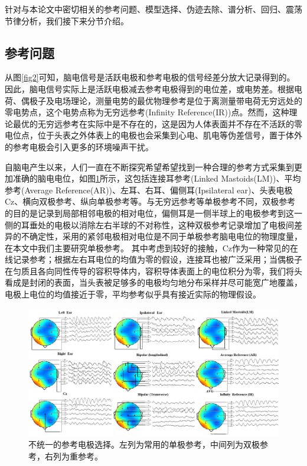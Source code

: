 针对与本论文中密切相关的参考问题、模型选择、伪迹去除、谱分析、回归、震荡节律分析，我们接下来分节介绍。
\subsection{参考问题}
从图\ref{fig2}可知，脑电信号是活跃电极和参考电极的信号经差分放大记录得到的。 因此，脑电信号实际上是活跃电极减去参考电极得到的电位差，或电势差。根据电荷、偶极子及电场理论，测量电势的最优物理参考是位于离测量带电荷无穷远处的零电势点，这个电势点称为无穷远参考(Infinity Reference(IR))点。然而，这种理论最优的无穷远参考在实际中是不存在的，这是因为人体表面并不存在不活跃的零电位点，位于头表之外体表上的电极也会采集到心电、肌电等伪差信号，置于体外的参考电极会引入更多的环境噪声干扰。 

自脑电产生以来，人们一直在不断探究希望希望找到一种合理的参考方式采集到更加准确的脑电电位，如图\ref{fig5}所示，这包括连接耳参考(Linked Mastoids(LM))、平均参考(Average Reference(AR))、左耳、右耳、偏侧耳(Ipsilateral ear)、头表电极Cz、横向双极参考、纵向单极参考等。与无穷远参考等单极参考不同，双极参考的目的是记录到局部相邻电极的相对电位，偏侧耳是一侧半球上的电极参考到这一侧的耳垂处的电极以消除左右半球的不对称性，这种双极参考记录增加了电极间差异的不确定性，采用的紧邻电极相对电位是不同于单极参考脑电电位的物理度量，在本文中我们主要研究单极参考。 其中考虑到较好的接触，Cz作为一种常见的在线记录参考；根据左右耳电位的均值为零的假设，连接耳也被广泛采用；当偶极子在匀质且各向同性传导的容积导体内，容积导体表面上的电位积分为零，我们将头看成是封闭的表面，当头表被足够多的电极均匀地分布采样并尽可能宽广地覆盖，电极上电位的均值接近于零，平均参考似乎具有接近实际的物理假设。

\begin{figure}
	\includegraphics[width=15cm]{pic/xulun/EEGref.png}
	\caption{不统一的参考电极选择。左列为常用的单极参考，中间列为双极参考，右列为重参考。}
	\label{fig5}
\end{figure}

